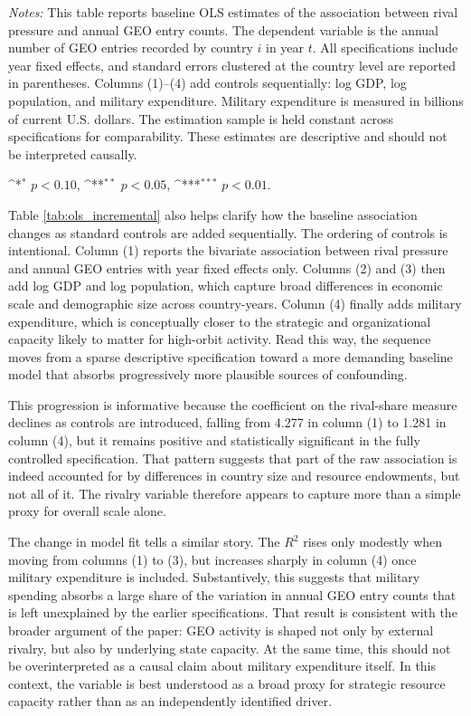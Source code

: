 \documentclass[11pt]{article}
\newcommand{\sym}[1]{\ifmmode^{#1}\else\(^{#1}\)\fi}
\begin{document}
\begin{table}[htbp]
\begin{threeparttable}
\begin{tablenotes}[flushleft]
\footnotesize
\item \textit{Notes:} This table reports baseline OLS estimates of the association between rival pressure and annual GEO entry counts. The dependent variable is the annual number of GEO entries recorded by country $i$ in year $t$. All specifications include year fixed effects, and standard errors clustered at the country level are reported in parentheses. Columns (1)--(4) add controls sequentially: log GDP, log population, and military expenditure. Military expenditure is measured in billions of current U.S. dollars. The estimation sample is held constant across specifications for comparability. These estimates are descriptive and should not be interpreted causally.
\item \sym{*} $p<0.10$, \sym{**} $p<0.05$, \sym{***} $p<0.01$.
\end{tablenotes}
\end{threeparttable}
\end{table}

Table \ref{tab:ols_incremental} also helps clarify how the baseline association changes as standard controls are added sequentially. The ordering of controls is intentional. Column (1) reports the bivariate association between rival pressure and annual GEO entries with year fixed effects only. Columns (2) and (3) then add log GDP and log population, which capture broad differences in economic scale and demographic size across country-years. Column (4) finally adds military expenditure, which is conceptually closer to the strategic and organizational capacity likely to matter for high-orbit activity. Read this way, the sequence moves from a sparse descriptive specification toward a more demanding baseline model that absorbs progressively more plausible sources of confounding.

This progression is informative because the coefficient on the rival-share measure declines as controls are introduced, falling from 4.277 in column (1) to 1.281 in column (4), but it remains positive and statistically significant in the fully controlled specification. That pattern suggests that part of the raw association is indeed accounted for by differences in country size and resource endowments, but not all of it. The rivalry variable therefore appears to capture more than a simple proxy for overall scale alone.

The change in model fit tells a similar story. The $R^2$ rises only modestly when moving from columns (1) to (3), but increases sharply in column (4) once military expenditure is included. Substantively, this suggests that military spending absorbs a large share of the variation in annual GEO entry counts that is left unexplained by the earlier specifications. That result is consistent with the broader argument of the paper: GEO activity is shaped not only by external rivalry, but also by underlying state capacity. At the same time, this should not be overinterpreted as a causal claim about military expenditure itself. In this context, the variable is best understood as a broad proxy for strategic resource capacity rather than as an independently identified driver.
\end{document}
